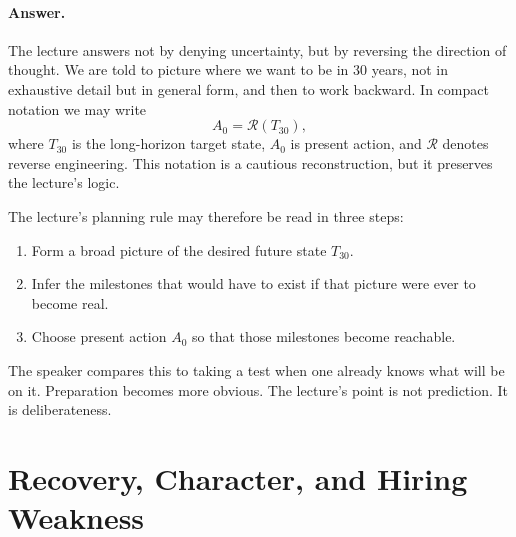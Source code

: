 \paragraph{Answer.} The lecture answers not by denying uncertainty, but by reversing the direction of thought. We are told to picture where we want to be in \(30\) years, not in exhaustive detail but in general form, and then to work backward. In compact notation we may write
\begin{equation}
A_0 = \mathcal{R}(T_{30}),
\end{equation}
where \(T_{30}\) is the long-horizon target state, \(A_0\) is present action, and \(\mathcal{R}\) denotes reverse engineering. This notation is a cautious reconstruction, but it preserves the lecture's logic.

\begin{figure}
\begin{center}
\end{center}
\end{figure}

The lecture's planning rule may therefore be read in three steps:
\begin{enumerate}
\item Form a broad picture of the desired future state \(T_{30}\).
\item Infer the milestones that would have to exist if that picture were ever to become real.
\item Choose present action \(A_0\) so that those milestones become reachable.
\end{enumerate}

The speaker compares this to taking a test when one already knows what will be on it. Preparation becomes more obvious. The lecture's point is not prediction. It is deliberateness.

\section{Recovery, Character, and Hiring Weakness}

